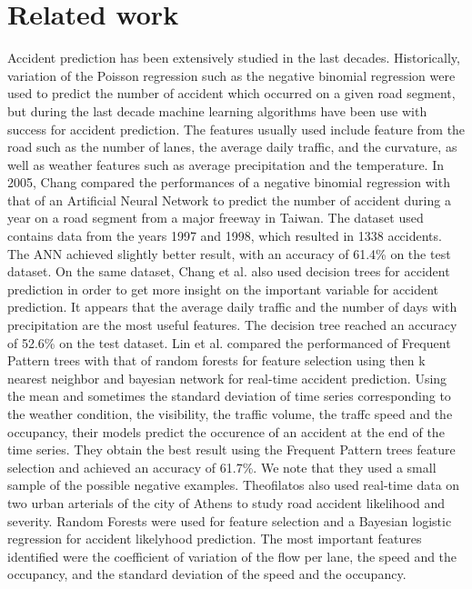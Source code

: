 \documentclass[conference]{IEEEtran}
\begin{document}
\section{Related work}
Accident prediction has been extensively studied in the last decades. Historically, variation of the Poisson regression such as the negative binomial regression were used to predict the number of accident which occurred on a given road segment, but during the last decade machine learning algorithms have been use with success for accident prediction. The features usually used include feature from the road such as the number of lanes, the average daily traffic, and the curvature, as well as weather features such as average precipitation and the temperature. In 2005, Chang \cite{Change2005} compared the performances of a negative binomial regression with that of an Artificial Neural Network to predict the number of accident during a year on a road segment from a major freeway in Taiwan. The dataset used contains data from the years 1997 and 1998, which resulted in 1338 accidents. The ANN achieved slightly better result, with an accuracy of 61.4\% on the test dataset. On the same dataset, Chang et al.\cite{Chang2005b} also used decision trees for accident prediction in order to get more insight on the important variable for accident prediction. It appears that the average daily traffic and the number of days with precipitation are the most useful features. The decision tree reached an accuracy of 52.6\% on the test dataset. Lin et al. \cite{Lin2015} compared the performanced of Frequent Pattern trees with that of random forests for feature selection using then k nearest neighbor and bayesian network for real-time accident prediction. Using the mean and sometimes the standard deviation of time series corresponding to the weather condition, the visibility, the traffic volume, the traffc speed and the occupancy, their models predict the occurence of an accident at the end of the time series. They obtain the best result using the Frequent Pattern trees feature selection and achieved an accuracy of 61.7\%. We note that they used a small sample of the possible negative examples. Theofilatos\cite{Theofilatos2017} also used real-time data on two urban arterials of the city of Athens to study road accident likelihood and severity. Random Forests were used for feature selection and a Bayesian logistic regression for accident likelyhood prediction. The most important features identified were the coefficient of variation of the flow per lane, the speed and the occupancy, and the standard deviation of the speed and the occupancy.
\end{document}
